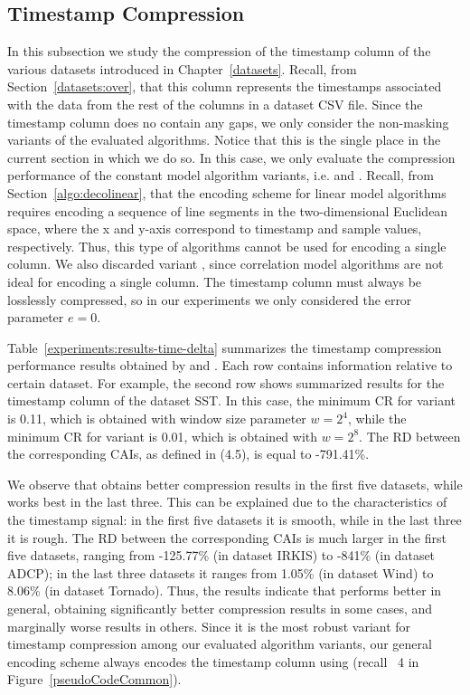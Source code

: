 
\subsection{Timestamp Compression}
\label{secX:timestampComp}

In this subsection we study the compression of the timestamp column of the various datasets introduced in Chapter~\ref{datasets}. Recall, from Section~\ref{datasets:over}, that this column represents the timestamps associated with the data from the rest of the columns in a dataset CSV file. Since the timestamp
column does no contain any gaps, we only consider the non-masking variants of the evaluated algorithms. Notice that this is the single place in the current section in which we do so. In this case, we only evaluate the compression performance of the constant model algorithm variants, i.e.  and . Recall, from Section~\ref{algo:decolinear}, that the encoding scheme for linear model algorithms requires encoding a sequence of line segments in the two-dimensional Euclidean space, where the x and y-axis correspond to timestamp and sample values, respectively. Thus, this type of algorithms cannot be used for encoding a single column. We also discarded variant , since correlation model algorithms are not ideal for encoding a single column. The timestamp column must always be losslessly compressed, so in our experiments we only considered the error parameter $e = 0$.


Table~\ref{experiments:results-time-delta} summarizes the timestamp compression performance results obtained by  and .  Each row contains information relative to certain dataset. For example, the second row shows summarized results for the timestamp column of the dataset SST. In this case, the minimum CR for variant  is 0.11, which is obtained with window size parameter $w=2^4$, while the minimum CR for variant  is 0.01, which is obtained with $w=2^8$. The RD between the corresponding CAIs, as defined in (4.5), is equal to -791.41\%.


We observe that  obtains better compression results in the first five datasets, while  works best in the last three. This can be explained due to the characteristics of the timestamp signal: in the first five datasets it is smooth, while in the last three it is rough. The RD between the corresponding CAIs is much larger in the first five datasets, ranging from -125.77\% (in dataset IRKIS) to -841\% (in dataset ADCP); in the last three datasets it ranges from 1.05\% (in dataset Wind) to 8.06\% (in dataset Tornado). Thus, the results indicate that  performs better in general, obtaining significantly better compression results in some cases, and marginally worse results in others. Since it is the most robust variant for timestamp compression among our evaluated algorithm variants, our general encoding scheme always encodes the timestamp column using  (recall \Line~4 in Figure~\ref{pseudoCodeCommon}).


\clearpage




